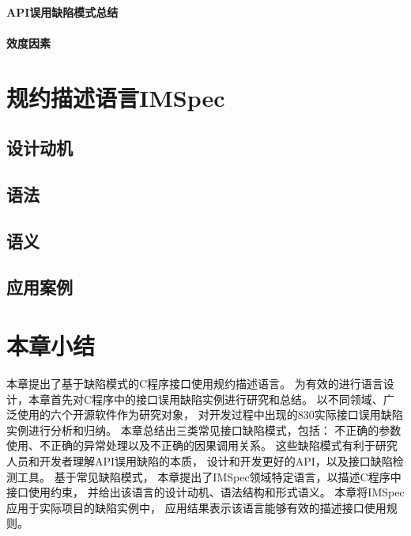 \paragraph{API误用缺陷模式总结}


\paragraph{效度因素}

\section{规约描述语言IMSpec}
\label{sec:2.4}
\subsection{设计动机}
\subsection{语法}
\subsection{语义}
\subsection{应用案例}


\section{本章小结}
\label{sec:2.5}
本章提出了基于缺陷模式的C程序接口使用规约描述语言。
为有效的进行语言设计，本章首先对C程序中的接口误用缺陷实例进行研究和总结。
以不同领域、广泛使用的六个开源软件作为研究对象，
对开发过程中出现的830实际接口误用缺陷实例进行分析和归纳。
本章总结出三类常见接口缺陷模式，包括：
不正确的参数使用、不正确的异常处理以及不正确的因果调用关系。
这些缺陷模式有利于研究人员和开发者理解API误用缺陷的本质，
设计和开发更好的API，以及接口缺陷检测工具。
基于常见缺陷模式，
本章提出了IMSpec领域特定语言，以描述C程序中接口使用约束，
并给出该语言的设计动机、语法结构和形式语义。
本章将IMSpec应用于实际项目的缺陷实例中，
应用结果表示该语言能够有效的描述接口使用规则。
